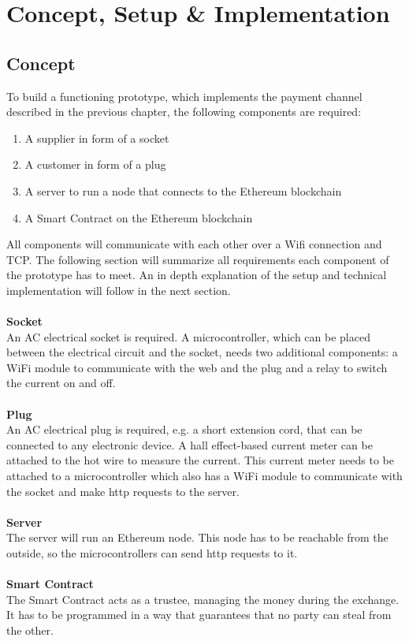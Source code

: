 \section{Concept, Setup \& Implementation}

\subsection{Concept}
To build a functioning prototype, which implements the payment channel described in the previous chapter, the following components are required:
\begin{enumerate}
    \item A supplier in form of a socket
    \item A customer in form of a plug
    \item A server to run a node that connects to the Ethereum blockchain
    \item A Smart Contract on the Ethereum blockchain
\end{enumerate}
All components will communicate with each other over a Wifi connection and TCP.
The following section will summarize all requirements each component of the prototype has to meet. An in depth explanation of the setup and technical implementation will follow in the next section.
\\\\
\textbf{Socket}\\
An AC electrical socket is required. A microcontroller, which can be placed between the electrical circuit and the socket, needs two additional components: a WiFi module to communicate with the web and the plug and a relay to switch the current on and off.
\\\\
\textbf{Plug}\\
An AC electrical plug is required, e.g. a short extension cord, that can be connected to any electronic device. A hall effect-based current meter can be attached to the hot wire to measure the current. This current meter needs to be attached to a microcontroller which also has a WiFi module to communicate with the socket and make http requests to the server.
\\\\
\textbf{Server}\\
The server will run an Ethereum node. This node has to be reachable from the outside, so the microcontrollers can send http requests to it.
\\\\
\textbf{Smart Contract}\\
The Smart Contract acts as a trustee, managing the money during the exchange. It has to be programmed in a way that guarantees that no party can steal from the other.

